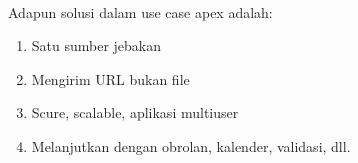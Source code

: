 \paragraph{} Adapun solusi dalam use case apex adalah:
\begin{enumerate}
    \item Satu sumber jebakan
    \item Mengirim URL bukan file
    \item Scure, scalable, aplikasi multiuser
    \item Melanjutkan dengan obrolan, kalender, validasi, dll.
\end{enumerate}
